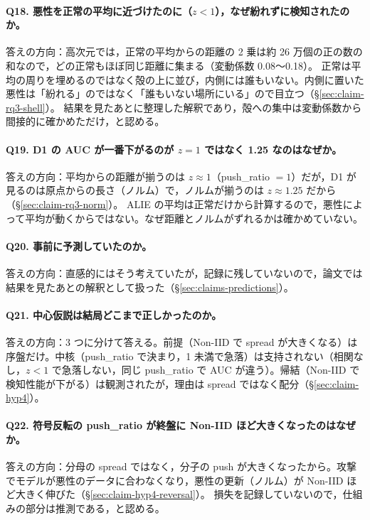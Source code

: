 \documentclass[a4j, dvipdfmx]{jsarticle}  %
\begin{document}
\paragraph{Q18. 悪性を正常の平均に近づけたのに（$z < 1$），なぜ紛れずに検知されたのか。}
答えの方向：高次元では，正常の平均からの距離の 2 乗は約 26 万個の正の数の和なので，どの正常もほぼ同じ距離に集まる（変動係数 0.08〜0.18）。
正常は平均の周りを埋めるのではなく殻の上に並び，内側には誰もいない。内側に置いた悪性は「紛れる」のではなく「誰もいない場所にいる」ので目立つ（\S\ref{sec:claim-rq3-shell}）。
結果を見たあとに整理した解釈であり，殻への集中は変動係数から間接的に確かめただけ，と認める。

\paragraph{Q19. D1 の AUC が一番下がるのが $z = 1$ ではなく 1.25 なのはなぜか。}
答えの方向：平均からの距離が揃うのは $z \approx 1$（push\_ratio $= 1$）だが，D1 が見るのは原点からの長さ（ノルム）で，ノルムが揃うのは $z \approx 1.25$ だから（\S\ref{sec:claim-rq3-norm}）。
ALIE の平均は正常だけから計算するので，悪性によって平均が動くからではない。なぜ距離とノルムがずれるかは確かめていない。

\paragraph{Q20. 事前に予測していたのか。}
答えの方向：直感的にはそう考えていたが，記録に残していないので，論文では結果を見たあとの解釈として扱った（\S\ref{sec:claims-predictions}）。

\paragraph{Q21. 中心仮説は結局どこまで正しかったのか。}
答えの方向：3 つに分けて答える。前提（Non-IID で spread が大きくなる）は序盤だけ。中核（push\_ratio で決まり，1 未満で急落）は支持されない（相関なし，$z < 1$ で急落しない，同じ push\_ratio で AUC が違う）。帰結（Non-IID で検知性能が下がる）は観測されたが，理由は spread ではなく配分（\S\ref{sec:claim-hyp4}）。

\paragraph{Q22. 符号反転の push\_ratio が終盤に Non-IID ほど大きくなったのはなぜか。}
答えの方向：分母の spread ではなく，分子の push が大きくなったから。攻撃でモデルが悪性のデータに合わなくなり，悪性の更新（ノルム）が Non-IID ほど大きく伸びた（\S\ref{sec:claim-hyp4-reversal}）。
損失を記録していないので，仕組みの部分は推測である，と認める。
\end{document}
